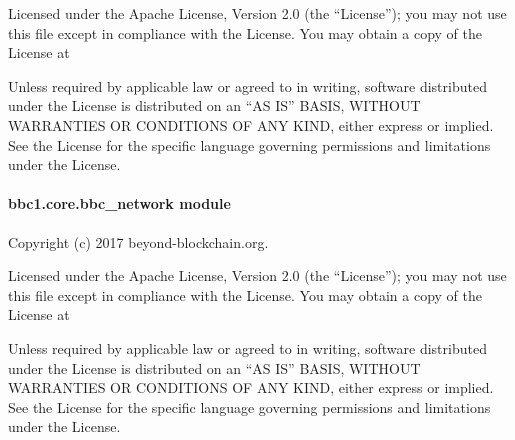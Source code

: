 \documentclass[letterpaper,10pt,english]{sphinxmanual}
\begin{document}
Licensed under the Apache License, Version 2.0 (the “License”);
you may not use this file except in compliance with the License.
You may obtain a copy of the License at
\begin{quote}

\end{quote}

Unless required by applicable law or agreed to in writing, software
distributed under the License is distributed on an “AS IS” BASIS,
WITHOUT WARRANTIES OR CONDITIONS OF ANY KIND, either express or implied.
See the License for the specific language governing permissions and
limitations under the License.


\paragraph{bbc1.core.bbc\_network module}
\label{\detokenize{bbc1.core.bbc_network:bbc1-core-bbc-network-module}}\label{\detokenize{bbc1.core.bbc_network:module-bbc1.core.bbc_network}}\label{\detokenize{bbc1.core.bbc_network::doc}}
Copyright (c) 2017 beyond-blockchain.org.

Licensed under the Apache License, Version 2.0 (the “License”);
you may not use this file except in compliance with the License.
You may obtain a copy of the License at
\begin{quote}

\end{quote}

Unless required by applicable law or agreed to in writing, software
distributed under the License is distributed on an “AS IS” BASIS,
WITHOUT WARRANTIES OR CONDITIONS OF ANY KIND, either express or implied.
See the License for the specific language governing permissions and
limitations under the License.
\end{document}
